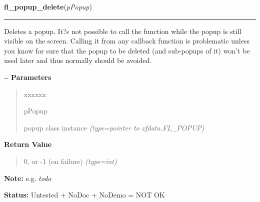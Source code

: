     \label{xformslib:flpopup:fl_popup_delete}

    \vspace{0.5ex}

\hspace{.8\funcindent}\begin{boxedminipage}{\funcwidth}

    \raggedright \textbf{fl\_popup\_delete}(\textit{pPopup})

    \vspace{-1.5ex}

    \rule{\textwidth}{0.5\fboxrule}
\setlength{\parskip}{2ex}

Deletes a popup. It?s not possible to call the function while the
popup is still visible on the screen. Calling it from any callback
function is problematic unless you know for sure that the popup to be
deleted (and sub-popups of it) won't be used later and thus normally
should be avoided.

-{}-
\setlength{\parskip}{1ex}
      \textbf{Parameters}
      \vspace{-1ex}

      \begin{quote}
        \begin{Ventry}{xxxxxx}

          \item[pPopup]


popup class instance
            {\it (type=pointer to xfdata.FL\_POPUP)}

        \end{Ventry}

      \end{quote}

      \textbf{Return Value}
    \vspace{-1ex}

      \begin{quote}

0, or -1 (on failure)
      {\it (type=int)}

      \end{quote}

\textbf{Note:} 
e.g. \emph{todo}


\textbf{Status:} 
Untested + NoDoc + NoDemo = NOT OK


    \end{boxedminipage}

    \label{xformslib:flpopup:fl_popup_entry_delete}

